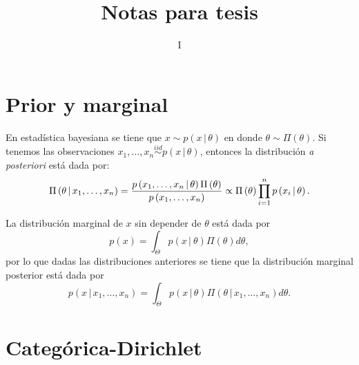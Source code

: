 \documentclass[runningheads,a4paper]{article}
\begin{document}

\title{Notas para tesis}


\author{I}




\maketitle

\section{Prior y marginal}

En estadística bayesiana se tiene que $x \sim p\left(x \,|\, \theta \right)$ %
en donde $\theta \sim \Pi\left( \theta \right)$. Si tenemos las observaciones %
$x_{1}, \ldots, x_{n} \stackrel{iid}{\sim} p\left(x \,|\, \theta \right)$, %
entonces la distribución \textit{a posteriori} está dada por:
%
\begin{equation} \label{eq:actual}
\Pi\left( \theta \,|\, x_{1},\ldots,x_{n} \right) = \frac{%
p\left(x_{1}, \ldots, x_{n} \,|\, \theta \right) \Pi\left( \theta \right)}%
{p\left( x_{1}, \ldots, x_{n} \right)}%
\propto %
\Pi\left( \theta \right) \prod_{i = 1}^{n} p\left(x_{i} \,|\, \theta \right).
\end{equation}

La distribución marginal de $x$ sin depender de $\theta$ está dada por %
%
\begin{equation} \label{eq:margpr}
p(x) = \int_{\Theta} p\left( x \,|\ \theta \right) \Pi( \theta ) d\theta,
\end{equation}
%
por lo que dadas las distribuciones anteriores se tiene que la distribución marginal posterior está dada por
%
\begin{equation} \label{eq:infer}
p\left( x \,|\, x_{1}, \ldots, x_{n} \right) = %
\int_{\Theta} p\left( x \,|\, \theta \right) %
\Pi\left( \theta \,|\, x_{1}, \ldots, x_{n} \right) d\theta.
\end{equation}

\section{Categórica-Dirichlet}
\end{document}
